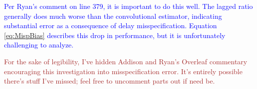 \documentclass{article}
\newcommand{\ahcomment}[1]{{\color{teal}[AH: #1]}}
\begin{document}
\textcolor{blue}{Per Ryan's comment on line 379, it is important to do this well. The lagged ratio generally does much worse than the convolutional estimator, indicating substantial error as a consequence of delay misspecification. Equation \ref{eq:MispBias} describes this drop in performance, but it is unfortunately challenging to analyze. 
}




\textcolor{brown}{For the sake of legibility, I've hidden Addison and Ryan's Overleaf commentary encouraging this investigation into misspecification error. It's entirely possible there's stuff I've missed; feel free to uncomment parts out if need be.}





\end{document}
